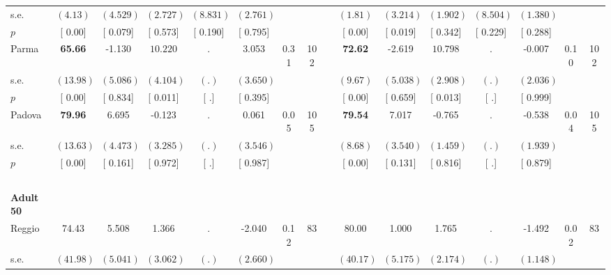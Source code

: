 \begin{longtable}{L{8em} c c c c c c c p{1em} c c c c c c c}
\quad \quad \quad \quad s.e.& $ (     4.13)$ & $ (    4.529)$ & $ (    2.727)$ & $ (    8.831)$ & $ (    2.761)$ & & & & $ (     1.81)$ & $ (    3.214)$ & $ (    1.902)$ & $ (    8.504)$ & $ (    1.380)$ & &  \\*
\quad \quad \quad \quad $ p$ & [     0.00] & [    0.079] & [    0.573] & [    0.190] & [    0.795] & & & & [     0.00] & [    0.019] & [    0.342] & [    0.229] & [    0.288] & &  \\[1em]
\quad \quad \quad Parma& \textbf{    65.66} &    -1.130 & $ \mathbf{   10.220}$ &         . &     3.053 &      0.31 &       102 & & \textbf{    72.62} &    -2.619 & $ \mathbf{   10.798}$ &         . &    -0.007 &      0.10 &       102  \\*
\quad \quad \quad \quad s.e.& $ (    13.98)$ & $ (    5.086)$ & $ (    4.104)$ & $ (        .)$ & $ (    3.650)$ & & & & $ (     9.67)$ & $ (    5.038)$ & $ (    2.908)$ & $ (        .)$ & $ (    2.036)$ & &  \\*
\quad \quad \quad \quad $ p$ & [     0.00] & [    0.834] & [    0.011] & [        .] & [    0.395] & & & & [     0.00] & [    0.659] & [    0.013] & [        .] & [    0.999] & &  \\[1em]
\quad \quad \quad Padova& \textbf{    79.96} &     6.695 &    -0.123 &         . &     0.061 &      0.05 &       105 & & \textbf{    79.54} &     7.017 &    -0.765 &         . &    -0.538 &      0.04 &       105  \\*
\quad \quad \quad \quad s.e.& $ (    13.63)$ & $ (    4.473)$ & $ (    3.285)$ & $ (        .)$ & $ (    3.546)$ & & & & $ (     8.68)$ & $ (    3.540)$ & $ (    1.459)$ & $ (        .)$ & $ (    1.939)$ & &  \\*
\quad \quad \quad \quad $ p$ & [     0.00] & [    0.161] & [    0.972] & [        .] & [    0.987] & & & & [     0.00] & [    0.131] & [    0.816] & [        .] & [    0.879] & &  \\[1em]
~\\[1em]
\quad \quad \textbf{Adult 50} & & & & & & & & & & & & & & & \\* 
\quad \quad \quad Reggio& 74.43 &     5.508 &     1.366 &         . &    -2.040 &      0.12 &        83 & & 80.00 &     1.000 &     1.765 &         . &    -1.492 &      0.02 &        83  \\*
\quad \quad \quad \quad s.e.& $ (    41.98)$ & $ (    5.041)$ & $ (    3.062)$ & $ (        .)$ & $ (    2.660)$ & & & & $ (    40.17)$ & $ (    5.175)$ & $ (    2.174)$ & $ (        .)$ & $ (    1.148)$ & &  \\*

\end{longtable}
